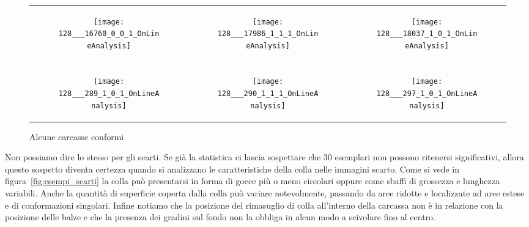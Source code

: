 \begin{figure}[ht] %
  \begin{center}
    \begin{tabular}{ccc}

  \begin{subfigure}{.3\linewidth}
    \centering\texttt{[image: 128\_\_\_16760\_0\_0\_1\_OnLineAnalysis]}
    \caption{}
  \end{subfigure} &

  \begin{subfigure}{.3\linewidth}
      \texttt{[image: 128\_\_\_17986\_1\_1\_1\_OnLineAnalysis]}
      \caption{}
    \end{subfigure} &

  \begin{subfigure}{.3\linewidth}
      \texttt{[image: 128\_\_\_18037\_1\_0\_1\_OnLineAnalysis]}
      \caption{}
    \end{subfigure} \\ \\

  \begin{subfigure}{.3\linewidth}
      \texttt{[image: 128\_\_\_289\_1\_0\_1\_OnLineAnalysis]}
      \caption{}
    \end{subfigure} &

  \begin{subfigure}{.3\linewidth}
      \texttt{[image: 128\_\_\_290\_1\_1\_1\_OnLineAnalysis]}
      \caption{}
    \end{subfigure} &

    \begin{subfigure}{.3\linewidth}
      \texttt{[image: 128\_\_\_297\_1\_0\_1\_OnLineAnalysis]}
      \caption{}
    \end{subfigure} \\

    \end{tabular}
    \caption{Alcune carcasse conformi}
    \label{fig:esempi_conformi}
  \end{center}
\end{figure}


Non possiamo dire lo stesso per gli scarti.
Se già la statistica ci lascia sospettare che $30$ esemplari non possono ritenersi significativi, allora questo sospetto diventa certezza quando si analizzano le caratteristiche della colla nelle immagini scarto.  
Come si vede in figura~\ref{fig:esempi_scarti} la colla può presentarsi in forma di gocce più o meno circolari oppure come sbaffi di grossezza e lunghezza variabili.
Anche la quantità di superficie coperta dalla colla può variare notevolmente, passando da aree ridotte e localizzate ad aree estese e di conformazioni singolari.
Infine notiamo che la posizione del rimasuglio di colla all'interno della carcassa non è in relazione con la posizione delle balze e che la presenza dei gradini sul fondo non la obbliga in alcun modo a scivolare fino al centro.

